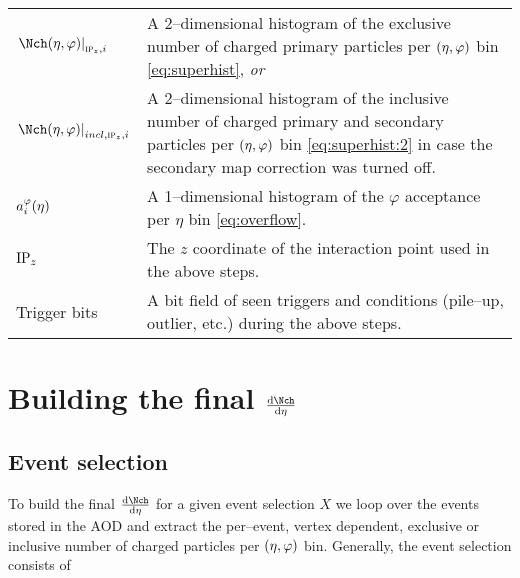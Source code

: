\documentclass[compat,11pt]{alicenote}
\DeclareRobustCommand{\AlwaysText}[1]{\ifmmode\relax\text{#1}\else #1\fi}
\newcommand*{\etaphi}{\ensuremath(\eta,\varphi)}
\newcommand{\AOD}{\AlwaysText{AOD}}
\newcommand{\dndetadphi}[1][]{{\ensuremath%
    \ifx|#1|\else\left.\fi%
      \Nch\etaphi%
      \ifx|#1|\else\right|_{#1}\fi}}
\newcommand{\phiAcc}{\ensuremath a_i^{\varphi}(\eta)}
\begin{document}
\begin{tabular}[T]{p{.2\linewidth}p{.76\linewidth}}
  $\dndetadphi[\subIPz,i]$ & A 2--dimensional histogram of the
                             exclusive number of charged primary
                             particles per $\etaphi$ bin
                             \eqref{eq:superhist}, \emph{or}\\ 
  $\dndetadphi[incl,\subIPz,i]$ & A 2--dimensional histogram of the
                                  inclusive number of charged primary
                                  and secondary particles per
                                  $\etaphi$ bin \eqref{eq:superhist:2}
                                  in case the secondary map correction
                                  was turned off.\\   
  $\phiAcc{}$ & A 1--dimensional histogram of the $\varphi$ acceptance
                per $\eta$ bin \eqref{eq:overflow}. \\
  $\IPz$ & The $z$ coordinate of the interaction point used in the
           above steps.\\
  Trigger bits & A bit field of seen triggers and conditions
                 (pile--up, \SPD{} outlier, etc.) during the above steps.\\ 
\end{tabular}


\clearpage
\section{Building the final $\dndeta$}
\label{sec:ana_aod}

\subsection{Event selection}

To build the final $\dndeta$ for a given event selection $X$ we loop
over the events stored in the \AOD{} and extract the per--event,
vertex dependent, exclusive or inclusive number of charged particles
per $\etaphi$ bin.   Generally, the event selection consists of 
\end{document}
